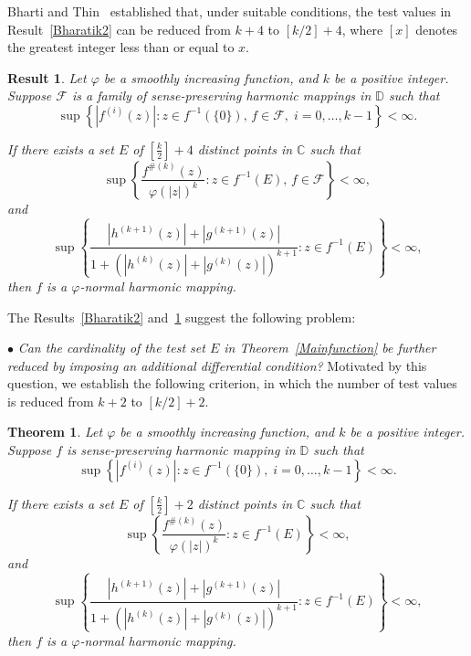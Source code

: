 \documentclass[11pt, reqno]{amsart}
\numberwithin{equation}{section}
\theoremstyle{definition}
\theoremstyle{remark}
\theoremstyle{plain}
\newtheorem{theorem}{Theorem}[section]
\newtheorem{result}{Result}[section]
\begin{document}
Bharti and Thin~\cite[Thoerem 1.10]{bharatithin} established that, 
under suitable conditions, the test values in Result~\ref{Bharatik2} 
can be reduced from $k+4$ to $[k/2]+4$,  where $[x]$ 
denotes the greatest integer less than or equal to $x$.
 \begin{result}\label{bharti3}\cite[Theorem 1.10]{bharatithin}
   Let $\varphi$ be a smoothly increasing function, and
$k$ be a positive integer. Suppose $\mathcal{F}$ is a family 
of sense-preserving harmonic mappings in $\mathbb{D}$ such that
\begin{equation}
\sup\left\{
|f^{(i)}(z)|:
z\in f^{-1}(\{0\}),\, f \in \mathcal{F}, \;
i=0,\ldots,k-1
\right\}<\infty.
\end{equation}

If there exists a set $E$ of $\left[\frac{k}{2}\right]+4$
 distinct points in $\mathbb{C}$ such that
\begin{equation}
\sup\left\{
\frac{f^{\#(k)}(z)}{\varphi(|z|)^k}
:
z\in f^{-1}(E), \, f \in \mathcal{F}
\right\}
<\infty,
\end{equation}
and
\begin{equation}
\sup\left\{
\frac{|h^{(k+1)}(z)|+|g^{(k+1)}(z)|}
{1+\left(|h^{(k)}(z)|+|g^{(k)}(z)|\right)^{k+1}}
:
z\in f^{-1}(E)
\right\}
<\infty,
\end{equation}
then $f$ is a $\varphi$-normal harmonic mapping.
 \end{result}
 
The Results~\ref{Bharatik2} and~\ref{bharti3} suggest the following 
problem: \smallskip

$\bullet$ {\it Can the cardinality of the test set $E$ in 
Theorem~\ref{Mainfunction} be further reduced by imposing 
an additional differential condition?}
Motivated by this question, we establish the following 
criterion, in which the number of test values is 
reduced from $k+2$ to $[k/2]+2$.


\begin{theorem}\label{K: twovaluefunction}
Let $\varphi$ be a smoothly increasing function, and
$k$ be a positive integer. Suppose $f$ is sense-preserving 
harmonic mapping in $\mathbb{D}$ such that
\begin{equation}\label{eq: K: 1twovaluefunction}
\sup\left\{
|f^{(i)}(z)|:
z\in f^{-1}(\{0\}),\;
i=0,\ldots,k-1
\right\}<\infty.
\end{equation}

If there exists a set $E$ of $\left[\frac{k}{2}\right]+2$ 
distinct points in $\mathbb{C}$ such that
\begin{equation}\label{eq: K: 2twovaluefunction}
\sup\left\{
\frac{f^{\#(k)}(z)}{\varphi(|z|)^k}
:
z\in f^{-1}(E)
\right\}
<\infty,
\end{equation}
and
\begin{equation}\label{eq: K: 3twovaluefunction}
\sup\left\{
\frac{|h^{(k+1)}(z)|+|g^{(k+1)}(z)|}
{1+\left(|h^{(k)}(z)|+|g^{(k)}(z)|\right)^{k+1}}
:
z\in f^{-1}(E)
\right\}
<\infty,
\end{equation}
then $f$ is a $\varphi$-normal harmonic mapping.
\end{theorem}
\end{document}
